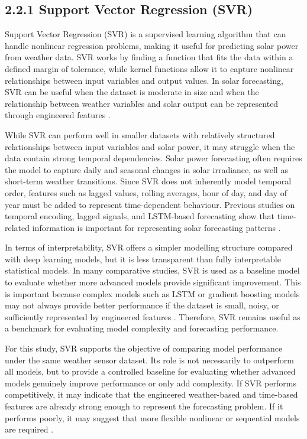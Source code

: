 \subsection{2.2.1 Support Vector Regression (SVR)}

Support Vector Regression (SVR) is a supervised learning algorithm that can handle nonlinear regression problems, making it useful for predicting solar power from weather data. SVR works by finding a function that fits the data within a defined margin of tolerance, while kernel functions allow it to capture nonlinear relationships between input variables and output values. In solar forecasting, SVR can be useful when the dataset is moderate in size and when the relationship between weather variables and solar output can be represented through engineered features \parencite{JnanaVarshitha2025, Alhassan2025}.

While SVR can perform well in smaller datasets with relatively structured relationships between input variables and solar power, it may struggle when the data contain strong temporal dependencies. Solar power forecasting often requires the model to capture daily and seasonal changes in solar irradiance, as well as short-term weather transitions. Since SVR does not inherently model temporal order, features such as lagged values, rolling averages, hour of day, and day of year must be added to represent time-dependent behaviour. Previous studies on temporal encoding, lagged signals, and LSTM-based forecasting show that time-related information is important for representing solar forecasting patterns \parencite{TsaiLo2025, Eren2025, JnanaVarshitha2025}.

In terms of interpretability, SVR offers a simpler modelling structure compared with deep learning models, but it is less transparent than fully interpretable statistical models. In many comparative studies, SVR is used as a baseline model to evaluate whether more advanced models provide significant improvement. This is important because complex models such as LSTM or gradient boosting models may not always provide better performance if the dataset is small, noisy, or sufficiently represented by engineered features \parencite{ArellanosTafur2025, JnanaVarshitha2025, Alhassan2025}. Therefore, SVR remains useful as a benchmark for evaluating model complexity and forecasting performance.

For this study, SVR supports the objective of comparing model performance under the same weather sensor dataset. Its role is not necessarily to outperform all models, but to provide a controlled baseline for evaluating whether advanced models genuinely improve performance or only add complexity. If SVR performs competitively, it may indicate that the engineered weather-based and time-based features are already strong enough to represent the forecasting problem. If it performs poorly, it may suggest that more flexible nonlinear or sequential models are required \parencite{JnanaVarshitha2025, Alhassan2025, Bakht2025}.


